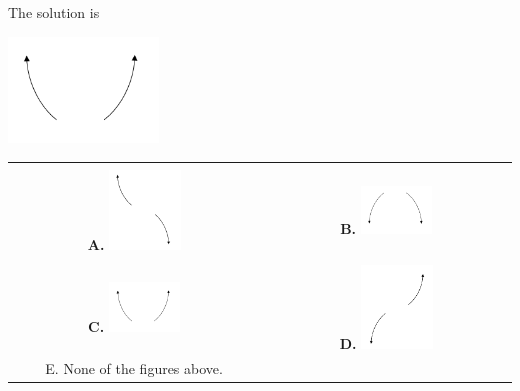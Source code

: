 \documentclass{article}[14pt]
\begin{document}
 
 The solution is  
 \begin{center} \includegraphics[width=0.3\textwidth]{../Figures/endBehaviorPositiveEvenB.png} \end{center}\begin{tabular}{|c|c|} 
\hline 
 & \tabularnewline 
 \textbf{A.} \includegraphics[width=0.3\textwidth]{../Figures/endBehaviorNegativeOddB.png} & \textbf{B.} \includegraphics[width=0.3\textwidth]{../Figures/endBehaviorNegativeEvenB.png} \tabularnewline 
\hline 
 & \tabularnewline 
 \textbf{C.} \includegraphics[width=0.3\textwidth]{../Figures/endBehaviorPositiveEvenB.png} & \textbf{D.} \includegraphics[width=0.3\textwidth]{../Figures/endBehaviorPositiveOddB.png} \tabularnewline 
\hline 
 E. None of the figures above. & \tabularnewline 
\hline 
 \end{tabular} 
 
\end{document}
